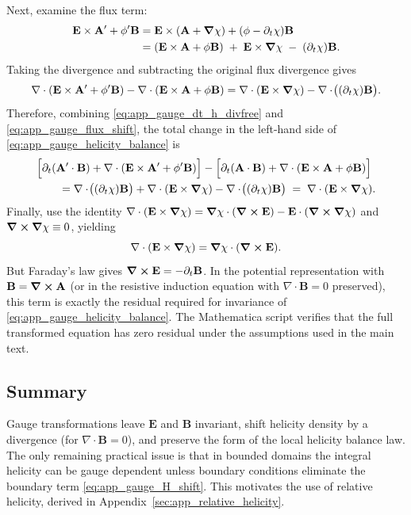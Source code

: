 \documentclass[11pt]{article}
\theoremstyle{plain}
\theoremstyle{definition}
\theoremstyle{remark}
\newcommand{\diver}{\nabla\cdot}
\newcommand{\A}{\mathbf{A}}
\newcommand{\B}{\mathbf{B}}
\newcommand{\E}{\mathbf{E}}
\begin{document}
Next, examine the flux term:
\begin{align}
  \E\times\A' + \phi'\B
  &= \E\times(\A+\grad\chi) + (\phi-\partial_t\chi)\B \\
  &= (\E\times\A + \phi\B) \;+\; \E\times\grad\chi \;-\; (\partial_t\chi)\B.
\end{align}
Taking the divergence and subtracting the original flux divergence gives
\begin{equation}\label{eq:app_gauge_flux_shift}
  \diver(\E\times\A' + \phi'\B) - \diver(\E\times\A + \phi\B)
  = \diver(\E\times\grad\chi) - \diver\!\big((\partial_t\chi)\B\big).
\end{equation}
Therefore, combining \eqref{eq:app_gauge_dt_h_divfree} and \eqref{eq:app_gauge_flux_shift}, the total
change in the left-hand side of \eqref{eq:app_gauge_helicity_balance} is
\begin{align}
  &\Big[\partial_t(\A'\cdot\B) + \diver(\E\times\A' + \phi'\B)\Big]
  - \Big[\partial_t(\A\cdot\B) + \diver(\E\times\A + \phi\B)\Big] \\
  &\qquad = \diver\!\big((\partial_t\chi)\B\big) + \diver(\E\times\grad\chi) - \diver\!\big((\partial_t\chi)\B\big)
  \;=\; \diver(\E\times\grad\chi).
\end{align}
Finally, use the identity $\diver(\E\times\grad\chi)=\grad\chi\cdot(\curl\E)-\E\cdot(\curl\grad\chi)$ and
$\curl\grad\chi\equiv 0$, yielding
\begin{equation}\label{eq:app_gauge_E_cross_grad}
  \diver(\E\times\grad\chi) = \grad\chi\cdot(\curl\E).
\end{equation}
But Faraday's law gives $\curl\E=-\partial_t\B$. In the potential representation with $\B=\curl\A$ (or
in the resistive induction equation with $\diver\B=0$ preserved), this term is exactly the residual
required for invariance of \eqref{eq:app_gauge_helicity_balance}. The Mathematica script verifies that
the full transformed equation has zero residual under the assumptions used in the main text.

\subsection{Summary}
Gauge transformations leave $\E$ and $\B$ invariant, shift helicity density by a divergence (for
$\diver\B=0$), and preserve the form of the local helicity balance law. The only remaining practical
issue is that in bounded domains the integral helicity can be gauge dependent unless boundary
conditions eliminate the boundary term \eqref{eq:app_gauge_H_shift}. This motivates the use of relative
helicity, derived in Appendix~\ref{sec:app_relative_helicity}.
\end{document}
